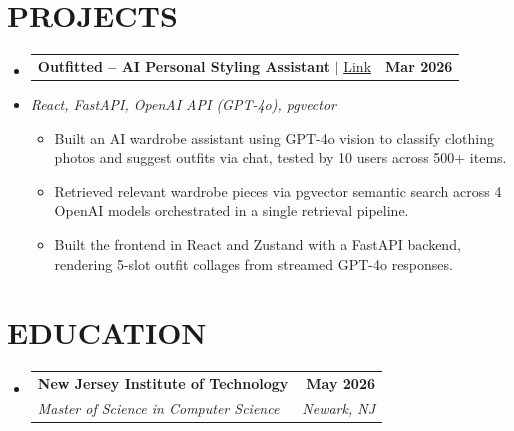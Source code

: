 \documentclass[letterpaper,11pt]{article}
\makeatletter
\newcommand{\resumeItem}[1]{
  \item\small{#1\vspace{-3pt}}
}
\newcommand{\resumeStack}[1]{
  \vspace{1pt}\item\small{\textit{#1}}\vspace{-6pt}
}
\newcommand{\resumeSubheading}[4]{
  \vspace{-3pt}\item
    \begin{tabular*}{1.0\textwidth}[t]{l@{\extracolsep{\fill}}r}
      \textbf{#1} & \textbf{\small #2} \\
      \textit{\small#3} & \textit{\small #4} \\
    \end{tabular*}\vspace{-9pt}
}
\newcommand{\resumeProjectHeading}[2]{
    \item
    \begin{tabular*}{1.001\textwidth}{l@{\extracolsep{\fill}}r}
      \small#1 & \textbf{\small #2}\\
    \end{tabular*}\vspace{-9pt}
}
\newcommand{\resumeItemListStart}{\begin{itemize}[leftmargin=0.15in, label=$\bullet$]}
\newcommand{\resumeItemListEnd}{\end{itemize}\vspace{-7pt}}
\newcommand{\resumeSubHeadingListStart}{\begin{itemize}[leftmargin=0.0in, label={}]}
\newcommand{\resumeSubHeadingListEnd}{\end{itemize}}
\makeatother
\begin{document}
\vspace{-3pt}
\section{PROJECTS}
\resumeSubHeadingListStart

\resumeProjectHeading
{\textbf{Outfitted -- AI Personal Styling Assistant} $|$ \href{https://github.com/talaviyakhushi/outfitted}{Link}}{Mar 2026}
\vspace{-9pt}
\resumeStack{React, FastAPI, OpenAI API (GPT-4o), pgvector}
\resumeItemListStart
  \resumeItem{Built an AI wardrobe assistant using GPT-4o vision to classify clothing photos and suggest outfits via chat, tested by 10 users across 500+ items.}
  \resumeItem{Retrieved relevant wardrobe pieces via pgvector semantic search across 4 OpenAI models orchestrated in a single retrieval pipeline.}
  \resumeItem{Built the frontend in React and Zustand with a FastAPI backend, rendering 5-slot outfit collages from streamed GPT-4o responses.}
\resumeItemListEnd

\resumeSubHeadingListEnd
\vspace{-3pt}
\section{EDUCATION}
\vspace{1pt}
\resumeSubHeadingListStart
\vspace{5pt}
\resumeSubheading
{New Jersey Institute of Technology}{May 2026}
{Master of Science in Computer Science}{Newark, NJ}
\resumeSubHeadingListEnd
\end{document}
